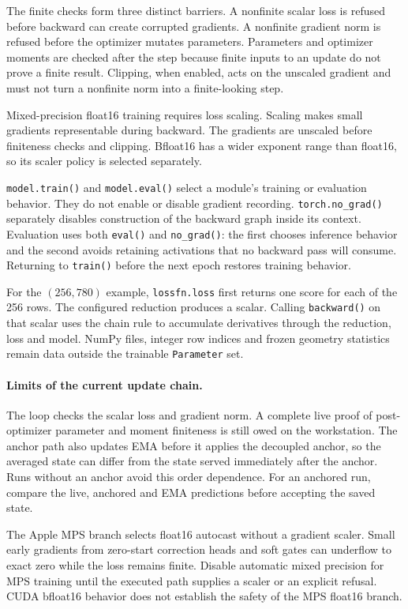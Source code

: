 \documentclass[10pt,aps,prd,twocolumn,nofootinbib]{revtex4-2}
\newcommand{\code}[1]{\texttt{#1}}
\begin{document}
The finite checks form three distinct barriers.  A nonfinite scalar loss is
refused before backward can create corrupted gradients.  A nonfinite gradient
norm is refused before the optimizer mutates parameters.  Parameters and
optimizer moments are checked after the step because finite inputs to an
update do not prove a finite result.  Clipping, when enabled, acts on the
unscaled gradient and must not turn a nonfinite norm into a finite-looking
step.

Mixed-precision float16 training requires loss scaling.  Scaling makes small
gradients representable during backward.  The gradients are unscaled before
finiteness checks and clipping.  Bfloat16 has a wider exponent range than
float16, so its scaler policy is selected separately.

\code{model.train()} and \code{model.eval()} select a module's training or
evaluation behavior.  They do not enable or disable gradient recording.
\code{torch.no\_grad()} separately disables construction of the backward
graph inside its context.  Evaluation uses both \code{eval()} and
\code{no\_grad()}: the first chooses inference behavior and the second avoids
retaining activations that no backward pass will consume.  Returning to
\code{train()} before the next epoch restores training behavior.

For the $(256,780)$ example, \code{lossfn.loss} first returns one score for
each of the 256 rows.  The configured reduction produces a scalar.  Calling
\code{backward()} on that scalar uses the chain rule to accumulate derivatives
through the reduction, loss and model.  NumPy files, integer row indices and
frozen geometry statistics remain data outside the trainable
\code{Parameter} set.

\paragraph{Limits of the current update chain.}
The loop checks the scalar loss and gradient norm.  A complete live proof of
post-optimizer parameter and moment finiteness is still owed on the
workstation.  The anchor path also updates EMA before it applies the decoupled
anchor, so the averaged state can differ from the state served immediately
after the anchor.  Runs without an anchor avoid this order dependence.  For an
anchored run, compare the live, anchored and EMA predictions before accepting
the saved state.

The Apple MPS branch selects float16 autocast without a gradient scaler.  Small
early gradients from zero-start correction heads and soft gates can underflow
to exact zero while the loss remains finite.  Disable automatic mixed
precision for MPS training until the executed path supplies a scaler or an
explicit refusal.  CUDA bfloat16 behavior does not establish the safety of the
MPS float16 branch.
\end{document}
